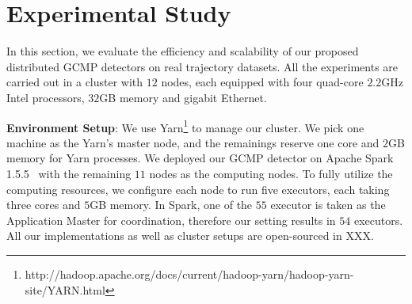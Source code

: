 \section{Experimental Study}
\label{sec:exp}
In this section, we evaluate the efficiency and scalability of our proposed distributed GCMP detectors on real trajectory datasets. All the experiments are carried out in a cluster with $12$ nodes, each equipped with four quad-core $2.2$GHz Intel processors, $32$GB memory and gigabit Ethernet. 

\textbf{Environment Setup}: We use Yarn\footnote{http://hadoop.apache.org/docs/current/hadoop-yarn/hadoop-yarn-site/YARN.html} to manage our cluster. We pick one machine as the Yarn's master node, and the remainings reserve one core and $2$GB memory for Yarn processes. We deployed our GCMP detector on Apache Spark 1.5.5~\cite{zaharia2012resilient} with the remaining $11$ nodes as the computing nodes.
To fully utilize the computing resources, we configure each node to run five executors, each taking three cores and $5$GB memory. In Spark, one of the $55$ executor is taken as the Application Master for coordination, therefore our setting results in $54$ executors.
All our implementations as well as cluster setups are open-sourced in XXX.



